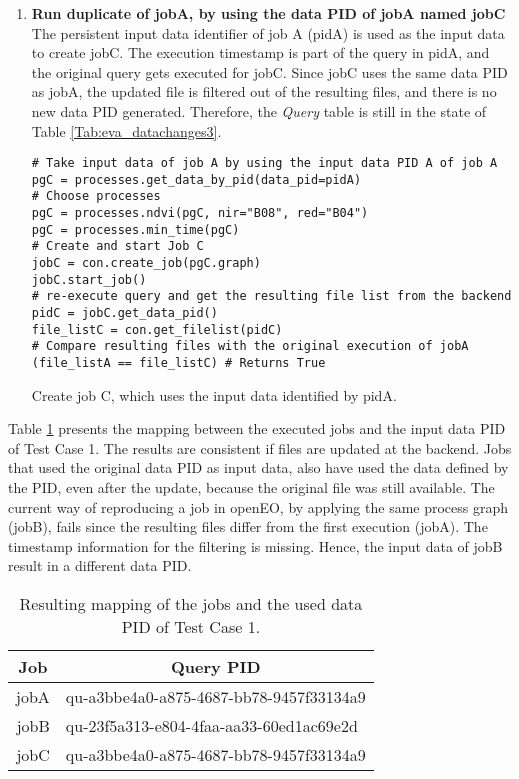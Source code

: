 \documentclass[draft,final]{vutinfth} %
\newenvironment{code}{\captionsetup{type=listing}}{}
\begin{document}
\begin{enumerate}
	\item \textbf{Run duplicate of jobA, by using the data PID of jobA named jobC}\\
	The persistent input data identifier of job A (pidA) is used as the input data to create jobC. The execution timestamp is part of the query in pidA, and the original query gets executed for jobC. Since jobC uses the same data PID as jobA, the updated file is filtered out of the resulting files, and there is no new data PID generated. Therefore, the \textit{Query} table is still in the state of Table \ref{Tab:eva_datachanges3}. 
	\begin{code}
		\begin{verbatim}
# Take input data of job A by using the input data PID A of job A
pgC = processes.get_data_by_pid(data_pid=pidA)
# Choose processes
pgC = processes.ndvi(pgC, nir="B08", red="B04")
pgC = processes.min_time(pgC)
# Create and start Job C
jobC = con.create_job(pgC.graph)
jobC.start_job()
# re-execute query and get the resulting file list from the backend
pidC = jobC.get_data_pid()
file_listC = con.get_filelist(pidC)
# Compare resulting files with the original execution of jobA
(file_listA == file_listC) # Returns True
		\end{verbatim}
		\caption{Create job C, which uses the input data identified by pidA.}
		\label{lst:eva_datachange_5}
	\end{code}
\end{enumerate}

Table \ref{Tab:eva_datachanges4} presents the mapping between the executed jobs and the input data PID of Test Case 1. The results are consistent if files are updated at the backend. Jobs that used the original data PID as input data, also have used the data defined by the PID, even after the update, because the original file was still available. The current way of reproducing a job in openEO, by applying the same process graph (jobB), fails since the resulting files differ from the first execution (jobA). The timestamp information for the filtering is missing. Hence,  the input data of jobB result in a different data PID.     

\begin{table}[]
	\caption{Resulting mapping of the jobs and the used data PID of Test Case 1.}
	\centering
	\begin{tabular}{|r|l|}
		\hline \multicolumn{1}{|c|}{\textbf{Job}}  &  \multicolumn{1}{c|}{\textbf{Query PID}} \\ \hline
		jobA & qu-a3bbe4a0-a875-4687-bb78-9457f33134a9  \\ 
		jobB & qu-23f5a313-e804-4faa-aa33-60ed1ac69e2d \\
		jobC & qu-a3bbe4a0-a875-4687-bb78-9457f33134a9  \\ \hline
	\end{tabular}
	\label{Tab:eva_datachanges4}
\end{table}
\end{document}
